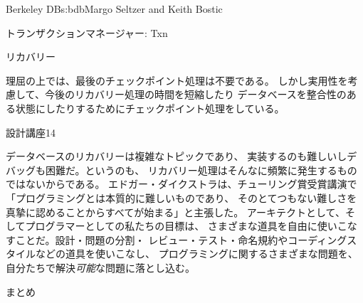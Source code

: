 \begin{aosachapter}{Berkeley DB}{s:bdb}{Margo Seltzer and Keith Bostic}
\begin{aosasect1}{トランザクションマネージャー: Txn}
\begin{aosasect2}{リカバリー}
\vspace{-0.2cm}

理屈の上では、最後のチェックポイント処理は不要である。
しかし実用性を考慮して、今後のリカバリー処理の時間を短縮したり
データベースを整合性のある状態にしたりするためにチェックポイント処理をしている。

\begin{aosabox}{設計講座14}

データベースのリカバリーは複雑なトピックであり、
実装するのも難しいしデバッグも困難だ。というのも、
リカバリー処理はそんなに頻繁に発生するものではないからである。
エドガー・ダイクストラは、チューリング賞受賞講演で
「プログラミングとは本質的に難しいものであり、
そのとてつもない難しさを真摯に認めることからすべてが始まる」と主張した。
アーキテクトとして、そしてプログラマーとしての私たちの目標は、
さまざまな道具を自由に使いこなすことだ。設計・問題の分割・
レビュー・テスト・命名規約やコーディングスタイルなどの道具を使いこなし、
プログラミングに関するさまざまな問題を、自分たちで解決\emph{可能}な問題に落とし込む。

\end{aosabox}

\end{aosasect2}

\end{aosasect1}
\newpage
\begin{aosasect1}{まとめ}


\end{aosasect1}
\end{aosachapter}

